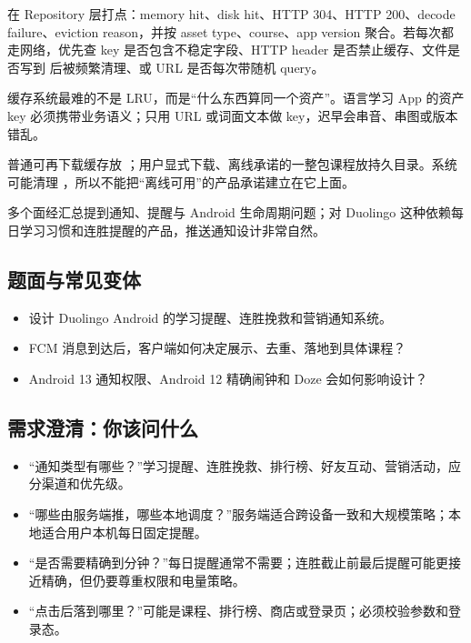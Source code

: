 \begin{followup}
在 Repository 层打点：memory hit、disk hit、HTTP 304、HTTP 200、decode failure、eviction reason，并按 asset type、course、app version 聚合。若每次都走网络，优先查 key 是否包含不稳定字段、HTTP header 是否禁止缓存、文件是否写到  后被频繁清理、或 URL 是否每次带随机 query。
\end{followup}

\begin{idea}[缓存首先是命名问题]
缓存系统最难的不是 LRU，而是“什么东西算同一个资产”。语言学习 App 的资产 key 必须携带业务语义；只用 URL 或词面文本做 key，迟早会串音、串图或版本错乱。
\end{idea}

\begin{keypoint}[目录选择]
普通可再下载缓存放 ；用户显式下载、离线承诺的一整包课程放持久目录。系统可能清理 ，所以不能把“离线可用”的产品承诺建立在它上面。
\end{keypoint}


\srccommunity 多个面经汇总提到通知、提醒与 Android 生命周期问题；\srcinferred 对 Duolingo 这种依赖每日学习习惯和连胜提醒的产品，推送通知设计非常自然。

\subsection{题面与常见变体}

\begin{itemize}
  \item 设计 Duolingo Android 的学习提醒、连胜挽救和营销通知系统。
  \item FCM 消息到达后，客户端如何决定展示、去重、落地到具体课程？
  \item Android 13 通知权限、Android 12 精确闹钟和 Doze 会如何影响设计？
\end{itemize}

\subsection{需求澄清：你该问什么}

\begin{itemize}
  \item “通知类型有哪些？”学习提醒、连胜挽救、排行榜、好友互动、营销活动，应分渠道和优先级。
  \item “哪些由服务端推，哪些本地调度？”服务端适合跨设备一致和大规模策略；本地适合用户本机每日固定提醒。
  \item “是否需要精确到分钟？”每日提醒通常不需要；连胜截止前最后提醒可能更接近精确，但仍要尊重权限和电量策略。
  \item “点击后落到哪里？”可能是课程、排行榜、商店或登录页；必须校验参数和登录态。
\end{itemize}

